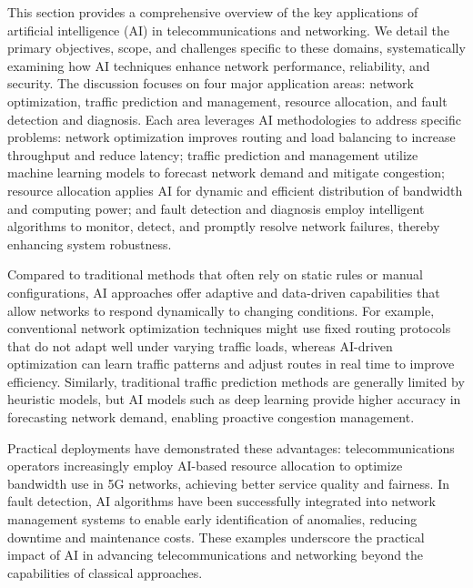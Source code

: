 \documentclass[sigconf]{acmart}
\begin{document}
This section provides a comprehensive overview of the key applications of artificial intelligence (AI) in telecommunications and networking. We detail the primary objectives, scope, and challenges specific to these domains, systematically examining how AI techniques enhance network performance, reliability, and security. The discussion focuses on four major application areas: network optimization, traffic prediction and management, resource allocation, and fault detection and diagnosis. Each area leverages AI methodologies to address specific problems: network optimization improves routing and load balancing to increase throughput and reduce latency; traffic prediction and management utilize machine learning models to forecast network demand and mitigate congestion; resource allocation applies AI for dynamic and efficient distribution of bandwidth and computing power; and fault detection and diagnosis employ intelligent algorithms to monitor, detect, and promptly resolve network failures, thereby enhancing system robustness.

Compared to traditional methods that often rely on static rules or manual configurations, AI approaches offer adaptive and data-driven capabilities that allow networks to respond dynamically to changing conditions. For example, conventional network optimization techniques might use fixed routing protocols that do not adapt well under varying traffic loads, whereas AI-driven optimization can learn traffic patterns and adjust routes in real time to improve efficiency. Similarly, traditional traffic prediction methods are generally limited by heuristic models, but AI models such as deep learning provide higher accuracy in forecasting network demand, enabling proactive congestion management.

Practical deployments have demonstrated these advantages: telecommunications operators increasingly employ AI-based resource allocation to optimize bandwidth use in 5G networks, achieving better service quality and fairness. In fault detection, AI algorithms have been successfully integrated into network management systems to enable early identification of anomalies, reducing downtime and maintenance costs. These examples underscore the practical impact of AI in advancing telecommunications and networking beyond the capabilities of classical approaches.
\end{document}

